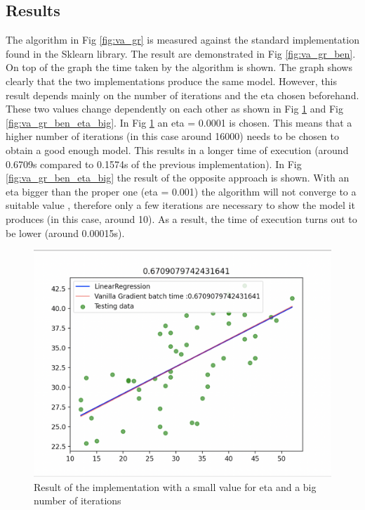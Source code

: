 \documentclass[conference]{IEEEtran}
\begin{document}
\subsection{Results}
The algorithm in Fig \ref{fig:va_gr} is measured against the standard implementation found in the Sklearn library. The result are demonstrated in Fig \ref{fig:va_gr_ben}. On top of the graph the time taken by the algorithm is shown.
The graph shows clearly that the two implementations produce the same model. However, this result depends mainly on the number of iterations and the eta chosen beforehand. These two values change dependently on each other as shown in Fig \ref{fig:va_gr_ben_eta_small} and
Fig \ref{fig:va_gr_ben_eta_big}. 
In Fig \ref{fig:va_gr_ben_eta_small} an eta = 0.0001 is chosen. This means that a higher number of iterations (in this case around 16000) needs to be chosen to obtain a good enough model.\cite{Scikit-Learn} This results in a longer time of execution (around 0.6709s compared to 0.1574s of the previous implementation). 
In Fig \ref{fig:va_gr_ben_eta_big} the result of the opposite approach is shown. With an eta bigger than the proper one (eta = 0.001) the algorithm will not converge to a suitable value \cite{Scikit-Learn}, therefore only a few iterations are necessary to show the model it produces (in this case, around 10). As a result, the time of execution turns out to be lower (around 0.00015s).


\begin{figure}[ht]
    \includegraphics[scale=0.35]{Fig2.png}
    \caption{Result of the implementation with a small value for eta and a big number of iterations}
    \label{fig:va_gr_ben_eta_small}
\end{figure}
\end{document}
